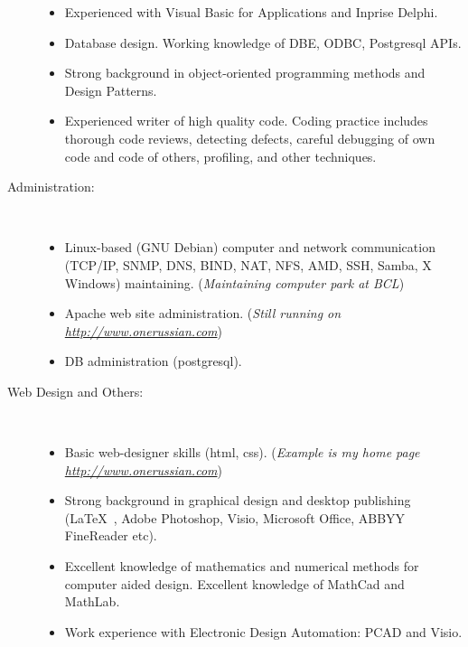 \documentclass[10pt,overlapped,line]{res}
\newcommand{\wdescription}[1]{({\small \textit{#1}})}
\begin{document}
\begin{resume}
\begin{description}
\begin{itemize}
     \item Experienced with Visual Basic for Applications and Inprise
       Delphi.

     \item Database design. Working knowledge of DBE, ODBC, Postgresql
       APIs. 
       
     \item Strong background in object-oriented programming methods
       and Design Patterns.

     \item Experienced writer of high quality code. Coding practice
       includes thorough code reviews, detecting defects, careful
       debugging of own code and code of others, profiling, and other
       techniques.
     \end{itemize} 

   \item[Administration:] \hspace*{\fill} \\ 
     \begin{itemize}
     \item Linux-based (GNU Debian) computer and network communication (TCP/IP,
       SNMP, DNS, BIND, NAT, NFS, AMD, SSH, Samba, X Windows) maintaining. 
       \wdescription{Maintaining computer park at BCL}
     \item Apache web site administration.
       \wdescription{Still running on \href{URL}{http://www.onerussian.com}}
     \item DB administration (postgresql).
     \end{itemize}

   \item[Web Design and Others:]  \hspace*{\fill} \\
     \begin{itemize}
     \item Basic web-designer skills (html, css).
       \wdescription{Example is my home page \href{URL}{http://www.onerussian.com}}
     \item Strong background in graphical design and desktop
       publishing (\LaTeX\ , Adobe Photoshop, Visio, Microsoft Office, ABBYY
       FineReader etc).
     \item Excellent knowledge of mathematics and numerical methods
       for computer aided design. Excellent knowledge of MathCad and
       MathLab.
     \item Work experience with Electronic Design Automation: PCAD and
       Visio.
     \end{itemize}
 \end{description}


\end{resume}
\end{document}

